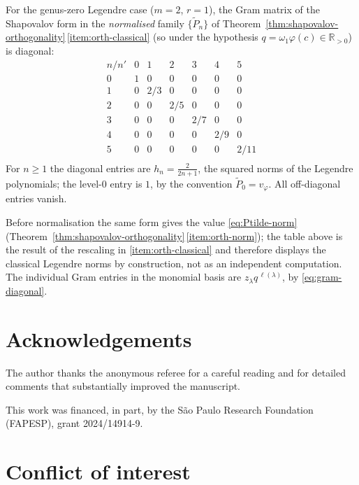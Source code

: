 \documentclass[12pt]{amsart}
\theoremstyle{plain}
\theoremstyle{definition}
\newcommand{\RR}{\mathbb{R}}
\newcommand{\vf}{v_\varphi}           %
\begin{document}
For the genus-zero Legendre case ($m=2$, $r=1$), the Gram matrix of the
Shapovalov form in the \emph{normalised} family $\{\tilde P_n\}$ of
Theorem~\ref{thm:shapovalov-orthogonality}\,\ref{item:orth-classical}
(so under the hypothesis $q = \omega_1\varphi(c)\in\RR_{>0}$) is
diagonal:
\[
\begin{array}{c|cccccc}
  n / n' & 0 & 1 & 2 & 3 & 4 & 5 \\
\hline
  0 & 1 & 0 & 0 & 0 & 0 & 0 \\
  1 & 0 & 2/3 & 0 & 0 & 0 & 0 \\
  2 & 0 & 0 & 2/5 & 0 & 0 & 0 \\
  3 & 0 & 0 & 0 & 2/7 & 0 & 0 \\
  4 & 0 & 0 & 0 & 0 & 2/9 & 0 \\
  5 & 0 & 0 & 0 & 0 & 0 & 2/11 \\
\end{array}
\]
For $n \geq 1$ the diagonal entries are $h_n = \frac{2}{2n+1}$, the
squared norms of the Legendre polynomials; the level-$0$ entry is $1$,
by the convention $\tilde{P}_0 = \vf$. All off-diagonal entries vanish.

Before normalisation the same form gives the value
\eqref{eq:Ptilde-norm}
(Theorem~\ref{thm:shapovalov-orthogonality}\,\ref{item:orth-norm}); the
table above is the result of the rescaling in
\ref{item:orth-classical} and therefore displays the classical Legendre
norms by construction, not as an independent computation. The individual
Gram entries in the monomial basis are $z_\lambda q^{\,\ell(\lambda)}$, by
\eqref{eq:gram-diagonal}.

\section*{Acknowledgements}

The author thanks the anonymous referee for a careful reading and for
detailed comments that substantially improved the manuscript.

This work was financed, in part, by the S\~ao Paulo Research Foundation
(FAPESP), grant 2024/14914-9.

\section*{Conflict of interest}
\end{document}
